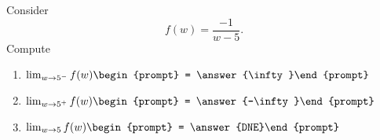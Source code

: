 \documentclass{ximera}
\author{Bart Snapp}
\begin{document}
\begin{exercise}
Consider 
\[
f(w) = \frac{-1}{w-5}.
\]
Compute
\begin{enumerate}
\item $\lim_{w\to 5^- } f(w) \begin{prompt} = \answer{\infty}\end{prompt}$
\item $\lim_{w\to 5^+ } f(w) \begin{prompt} = \answer{-\infty}\end{prompt}$
\item $\lim_{w\to 5 } f(w) \begin{prompt} = \answer{DNE}\end{prompt}$
\end{enumerate}
\end{exercise}
\end{document}
